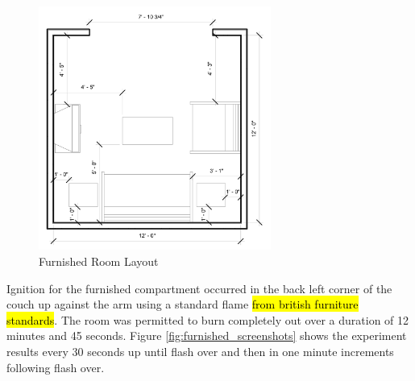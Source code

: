 \documentclass{article}
\begin{document}
\begin{figure}[H]
	\centering
	\includegraphics[width=3in]{0_Images/Vent_Limited_Room/Furnished_Room.jpg}
	\caption{Furnished Room Layout}
	\label{fig:furnished_layout}
\end{figure}

Ignition for the furnished compartment occurred in the back left corner of the couch up against the arm using a standard flame \hl{from british furniture standards}. The room was permitted to burn completely out over a duration of 12 minutes and 45 seconds. Figure \ref{fig:furnished_screenshots}  shows the experiment results every 30 seconds up until flash over and then in one minute increments following flash over. 
\end{document}
